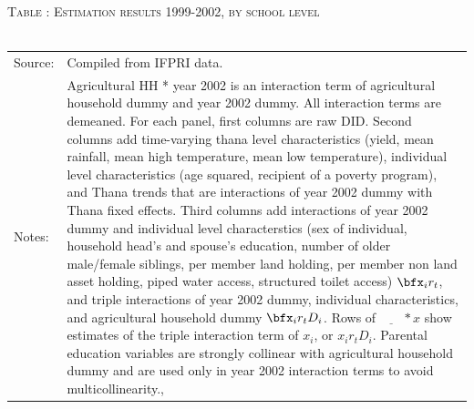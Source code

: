 \begin{table}\hfil\textsc{\footnotesize Table \thetable: Estimation results 1999-2002, by school level\label{zEm.1999.10.sameN}}\\\setlength{\tabcolsep}{.5pt}\renewcommand{\arraystretch}{.675}\hspace{-2em}\hfil\\\renewcommand{\arraystretch}{1}\hfil\begin{tabular}{>{\hfill\scriptsize}p{1cm}<{}>{\scriptsize}p{12cm}<{\hfill}} Source:& Compiled from IFPRI data. \\[-1ex] Notes:&   \textsf{Agricultural HH * year 2002} is an interaction term of agricultural household dummy and year 2002 dummy. All interaction terms are demeaned. For each panel, first columns are raw DID. Second columns add time-varying thana level characteristics (yield, mean rainfall, mean high temperature, mean low temperature), individual level characteristics (age squared, recipient of a poverty program), and \textsf{Thana trends} that are interactions of year 2002 dummy with Thana fixed effects. Third columns add interactions of year 2002 dummy and individual level characterstics (sex of individual, household head's and spouse's education, number of older male/female siblings, per member land holding, per member non land asset holding, piped water access, structured toilet access) $\bfx_{i}r_{t}$, and triple interactions of year 2002 dummy, individual characteristics, and agricultural household dummy $\bfx_{i}r_{t}D_{i}$. Rows of $\underline{\phantom{mm}}*x$ show estimates of the triple interaction term of $x_{i}$, or $x_{i}r_{t}D_{i}$. Parental education variables are strongly collinear with agricultural household dummy and are used only in year 2002 interaction terms to avoid multicollinearity., \\   \end{tabular} \end{table}


